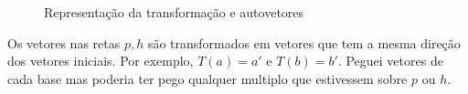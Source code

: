 \documentclass[english,ngerman,parskip=half]{scrartcl}
\begin{document}
\begin{enumerate}
\begin{enumerate}
\begin{figure}[ht!]
                \caption{Representação da transformação e autovetores}
            \end{figure}
            Os vetores nas retas $p, h$ são transformados em vetores que tem a mesma direção dos vetores iniciais. Por exemplo,
            $T(a) = a'$ e $T(b) = b'$. Peguei vetores de cada base mas poderia ter pego qualquer multiplo que estivessem sobre $p$ ou $h$.

        \end{enumerate}
%

\end{enumerate}
\end{document}
